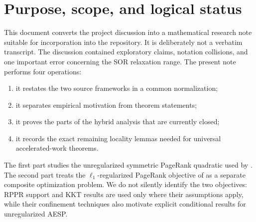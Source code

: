 \section{Purpose, scope, and logical status}
\label{sec:scope}

This document converts the project discussion into a mathematical research
note suitable for incorporation into the repository.  It is deliberately not
a verbatim transcript.  The discussion contained exploratory claims, notation
collisions, and one important error concerning the SOR relaxation range.  The
present note performs four operations:
\begin{enumerate}[label=(\roman*),leftmargin=2.2em]
  \item it restates the two source frameworks in a common normalization;
  \item it separates empirical motivation from theorem statements;
  \item it proves the parts of the hybrid analysis that are currently closed;
  \item it records the exact remaining locality lemmas needed for universal
        accelerated-work theorems.
\end{enumerate}

The first part studies the unregularized symmetric PageRank quadratic used by
\citet{huang2025accelerated}.  The second part treats the
$\ell_1$-regularized PageRank objective of
\citet{fountoulakis2026complexity} as a separate composite optimization
problem.  We do not silently identify the two objectives: RPPR support and KKT
results are used only where their assumptions apply, while their confinement
techniques also motivate explicit conditional results for unregularized AESP.


